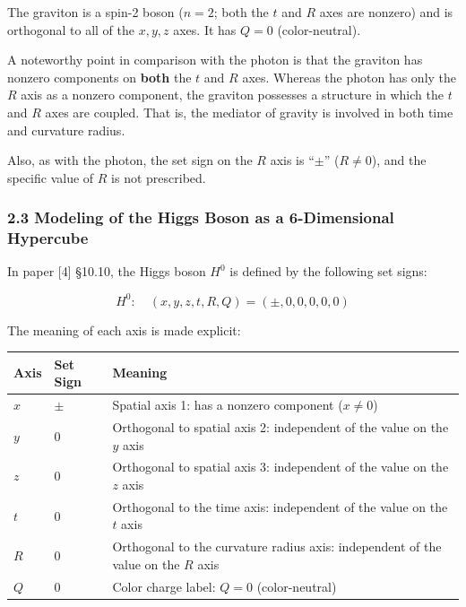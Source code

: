 \documentclass[
  a4paper,11pt]{article}
\newcounter{none}
\theoremstyle{definition}
\theoremstyle{remark}
\begin{document}
The graviton is a spin-2 boson (\(n = 2\); both the \(t\) and \(R\) axes
are nonzero) and is orthogonal to all of the \(x, y, z\) axes. It has
\(Q = 0\) (color-neutral).

A noteworthy point in comparison with the photon is that the graviton
has nonzero components on \textbf{both} the \(t\) and \(R\) axes.
Whereas the photon has only the \(R\) axis as a nonzero component, the
graviton possesses a structure in which the \(t\) and \(R\) axes are
coupled. That is, the mediator of gravity is involved in both time and
curvature radius.

Also, as with the photon, the set sign on the \(R\) axis is ``\(\pm\)''
(\(R \neq 0\)), and the specific value of \(R\) is not prescribed.

\subsubsection{2.3 Modeling of the Higgs Boson as a 6-Dimensional
Hypercube}\label{modeling-of-the-higgs-boson-as-a-6-dimensional-hypercube}

In paper {[}4{]} §10.10, the Higgs boson \(H^0\) is defined by the
following set signs:

\[H^0: \quad (x, y, z, t, R, Q) = (\pm, 0, 0, 0, 0, 0)\]

The meaning of each axis is made explicit:

{\def\LTcaptype{none} %
\begin{longtable}[]{@{}
  >{\centering\arraybackslash}p{}
  >{\centering\arraybackslash}p{}
  >{\raggedright\arraybackslash}p{}@{}}
\toprule\noalign{}
\begin{minipage}[b]{\linewidth}\centering
Axis
\end{minipage} & \begin{minipage}[b]{\linewidth}\centering
Set Sign
\end{minipage} & \begin{minipage}[b]{\linewidth}\raggedright
Meaning
\end{minipage} \\
\midrule\noalign{}
\endhead
\bottomrule\noalign{}
\endlastfoot
\(x\) & \(\pm\) & Spatial axis 1: has a nonzero component
(\(x \neq 0\)) \\
\(y\) & \(0\) & Orthogonal to spatial axis 2: independent of the value
on the \(y\) axis \\
\(z\) & \(0\) & Orthogonal to spatial axis 3: independent of the value
on the \(z\) axis \\
\(t\) & \(0\) & Orthogonal to the time axis: independent of the value on
the \(t\) axis \\
\(R\) & \(0\) & Orthogonal to the curvature radius axis: independent of
the value on the \(R\) axis \\
\(Q\) & \(0\) & Color charge label: \(Q = 0\) (color-neutral) \\
\end{longtable}
}
\end{document}
